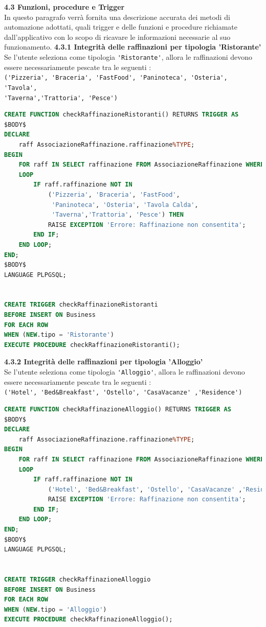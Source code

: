 \documentclass[a4paper,12pt]{article}
\begin{document}
\newpage\null{}\setcounter{page}{16}
\vspace{-2cm}
{\flushleft \bf 4.3 Funzioni, procedure e Trigger}
\\In questo paragrafo verrà fornita una descrizione accurata dei metodi di automazione adottati, quali trigger e delle funzioni e procedure richiamate dall'applicativo con lo scopo di ricavare le informazioni necessarie al suo funzionamento.
\vspace*{+1cm}
\newline
{\bf 4.3.1  Integrità delle raffinazioni per tipologia 'Ristorante'}\\
\normalsize{Se l'utente seleziona come tipologia \verb|'Ristorante'|, allora le raffinazioni
devono essere necessariamente pescate tra le seguenti : \\
\verb|('Pizzeria', 'Braceria', 'FastFood', 'Paninoteca', 'Osteria', 'Tavola',|\\
\verb|'Taverna','Trattoria', 'Pesce')|}
\begin{lstlisting}[language=SQL]
CREATE FUNCTION checkRaffinazioneRistoranti() RETURNS TRIGGER AS
$BODY$
DECLARE
	raff AssociazioneRaffinazione.raffinazione%TYPE;
BEGIN
	FOR raff IN SELECT raffinazione FROM AssociazioneRaffinazione WHERE codBusiness = NEW.codBusiness
	LOOP
		IF raff.raffinazione NOT IN 
			('Pizzeria', 'Braceria', 'FastFood',
			 'Paninoteca', 'Osteria', 'Tavola Calda',
			 'Taverna','Trattoria', 'Pesce') THEN
			RAISE EXCEPTION 'Errore: Raffinazione non consentita';
		END IF;
	END LOOP;
END;
$BODY$
LANGUAGE PLPGSQL;


CREATE TRIGGER checkRaffinazioneRistoranti
BEFORE INSERT ON Business
FOR EACH ROW
WHEN (NEW.tipo = 'Ristorante')
EXECUTE PROCEDURE checkRaffinazioneRistoranti();
\end{lstlisting}
\vspace*{+1cm}

{\flushleft \bf 4.3.2  Integrità delle raffinazioni per tipologia 'Alloggio'}\\
\normalsize{Se l'utente seleziona come tipologia \verb|'Alloggio'|, allora le raffinazioni
devono essere necessariamente pescate tra le seguenti : \\
\verb|('Hotel', 'Bed&Breakfast', 'Ostello', 'CasaVacanze' ,'Residence')|}
\begin{lstlisting}[language=SQL]
CREATE FUNCTION checkRaffinazioneAlloggio() RETURNS TRIGGER AS
$BODY$
DECLARE
	raff AssociazioneRaffinazione.raffinazione%TYPE;
BEGIN
	FOR raff IN SELECT raffinazione FROM AssociazioneRaffinazione WHERE codBusiness = NEW.codBusiness
	LOOP
		IF raff.raffinazione NOT IN 
			('Hotel', 'Bed&Breakfast', 'Ostello', 'CasaVacanze' ,'Residence') THEN
			RAISE EXCEPTION 'Errore: Raffinazione non consentita';
		END IF;
	END LOOP;
END;
$BODY$
LANGUAGE PLPGSQL;


CREATE TRIGGER checkRaffinazioneAlloggio
BEFORE INSERT ON Business
FOR EACH ROW
WHEN (NEW.tipo = 'Alloggio')
EXECUTE PROCEDURE checkRaffinazioneAlloggio();
\end{lstlisting}
\vspace*{+1cm}
\end{document}
